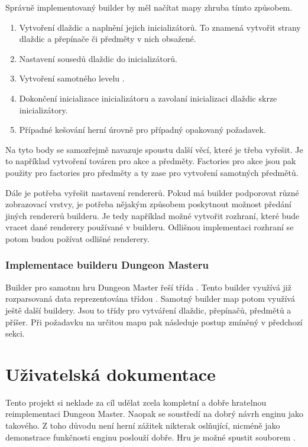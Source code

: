 Správně implementovaný builder by měl načítat mapy zhruba tímto způsobem. 

\begin{enumerate}

\item Vytvoření dlaždic a naplnění jejich inicializátorů. 
To znamená vytvořit strany dlaždic a přepínače či předměty v nich obsažené.

\item Nastavení sousedů dlaždic do inicializátorů. 

\item Vytvoření samotného levelu .

\item Dokončení inicializace inicializátoru a zavolaní inicializaci dlaždic skrze inicializátory. 

\item Případné kešování herní úrovně pro případný opakovaný požadavek. 
\end{enumerate}

Na tyto body se samozřejmě navazuje spoustu další věcí, které je třeba vyřešit. 
Je to například vytvoření továren pro akce a předměty. Factories pro akce jsou pak použity pro
factories pro předměty a ty zase pro vytvoření samotných předmětů. 

 Dále je potřeba vyřešit 
nastavení rendererů. Pokud má builder podporovat různé zobrazovací vrstvy, je potřeba 
nějakým způsobem poskytnout možnost předání jiných rendererů builderu. Je tedy například
možné vytvořit rozhraní, které bude vracet dané renderery používané v builderu. Odlišnou
implementaci rozhraní se potom budou požívat odlišné renderery.


\subsection{Implementace builderu Dungeon Masteru}
Builder pro samotnu hru Dungeon Master řeší třída . Tento builder
využívá již rozparsovaná data reprezentována třídou .
Samotný builder map potom využívá ještě další buildery. Jsou to třídy pro vytváření
dlaždic, přepínačů, předmětů a příšer. Při požadavku na určitou mapu pak 
následuje postup zmíněný v předchozí sekci.

\chapter{Uživatelská dokumentace}
Tento projekt si neklade za cíl udělat zcela kompletní a dobře hratelnou reimplementaci Dungeon Master.
Naopak se soustředí na dobrý návrh enginu jako takového. Z toho důvodu není herní zážitek nikterak
oslňující, nicméně jako demonstrace funkčnosti enginu poslouží dobře. Hru je možné spustit souborem
.

